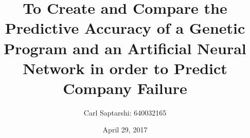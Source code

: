 \documentclass{article}
\begin{document}
\title{To Create and Compare the Predictive Accuracy of a Genetic Program and an Artificial Neural Network in order to Predict Company Failure }
\author{Carl Saptarshi: 640032165}
\date{April 29, 2017}
\maketitle
\end{document}
